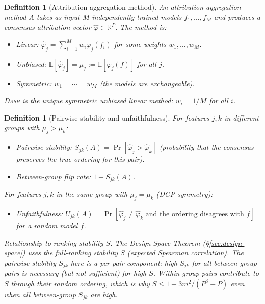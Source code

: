\documentclass{article}
\newtheorem{definition}[theorem]{Definition}
\newcommand{\R}{\mathbb{R}}
\newcommand{\E}{\mathbb{E}}
\newcommand{\DASH}{\textsc{Dash}}
\begin{document}
\begin{definition}[Attribution aggregation method]
An \emph{attribution aggregation method} $A$ takes as input $M$ independently trained models $f_1, \ldots, f_M$ and produces a consensus attribution vector $\hat\varphi \in \R^P$. The method is:
\begin{itemize}
    \item \emph{Linear}: $\hat\varphi_j = \sum_{i=1}^M w_i \varphi_j(f_i)$ for some weights $w_1, \ldots, w_M$.
    \item \emph{Unbiased}: $\E[\hat\varphi_j] = \mu_j := \E[\varphi_j(f)]$ for all $j$.
    \item \emph{Symmetric}: $w_1 = \cdots = w_M$ (the models are exchangeable).
\end{itemize}
\DASH{} is the unique symmetric unbiased linear method: $w_i = 1/M$ for all $i$.
\end{definition}

\begin{definition}[Pairwise stability and unfaithfulness]
For features $j, k$ in different groups with $\mu_j > \mu_k$:
\begin{itemize}
    \item \emph{Pairwise stability}: $S_{jk}(A) = \Pr[\hat\varphi_j > \hat\varphi_k]$ (probability that the consensus preserves the true ordering for this pair).
    \item \emph{Between-group flip rate}: $1 - S_{jk}(A)$.
\end{itemize}
For features $j, k$ in the same group with $\mu_j = \mu_k$ (DGP symmetry):
\begin{itemize}
    \item \emph{Unfaithfulness}: $U_{jk}(A) = \Pr[\hat\varphi_j \neq \hat\varphi_k \text{ and the ordering disagrees with } f]$ for a random model $f$.
\end{itemize}

\emph{Relationship to ranking stability $S$.} The Design Space Theorem (\S\ref{sec:design-space}) uses the full-ranking stability $S$ (expected Spearman correlation). The pairwise stability $S_{jk}$ here is a per-pair component: high $S_{jk}$ for all between-group pairs is necessary (but not sufficient) for high $S$. Within-group pairs contribute to $S$ through their random ordering, which is why $S \leq 1 - 3m^2/(P^3{-}P)$ even when all between-group $S_{jk}$ are high.
\end{definition}
\end{document}
